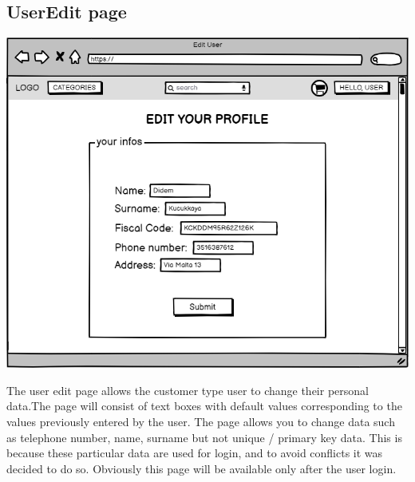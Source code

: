 \subsection{UserEdit page}
    \includegraphics[width=\textwidth,height=\textheight,keepaspectratio]{mockups/userEditPageMockup.png}

The user edit page allows the customer type user to change their personal data.The page will consist of text boxes with default values corresponding to the values previously entered by the user. The page allows you to change data such as telephone number, name, surname but not unique / primary key data. This is because these particular data are used for login, and to avoid conflicts it was decided to do so.
Obviously this page will be available only after the user login.
    
